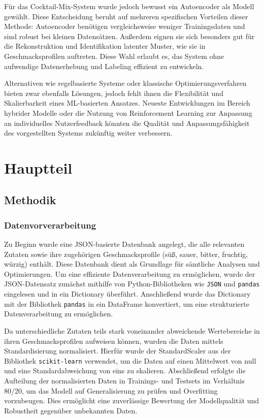 \documentclass[12pt, a4paper]{report}
\begin{document}
Für das Cocktail-Mix-System wurde jedoch bewusst ein Autoencoder als Modell gewählt. Diese Entscheidung beruht auf mehreren spezifischen Vorteilen dieser Methode: Autoencoder benötigen vergleichsweise weniger Trainingsdaten und sind robust bei kleinen Datensätzen. Außerdem eignen sie sich besonders gut für die Rekonstruktion und Identifikation latenter Muster, wie sie in Geschmacksprofilen auftreten. Diese Wahl erlaubt es, das System ohne aufwendige Datenerhebung und Labeling effizient zu entwickeln.

Alternativen wie regelbasierte Systeme oder klassische Optimierungsverfahren bieten zwar ebenfalls Lösungen, jedoch fehlt ihnen die Flexibilität und Skalierbarkeit eines ML-basierten Ansatzes. Neueste Entwicklungen im Bereich hybrider Modelle oder die Nutzung von Reinforcement Learning zur Anpassung an individuelles Nutzerfeedback könnten die Qualität und Anpassungsfähigkeit des vorgestellten Systems zukünftig weiter verbessern.


\chapter{Hauptteil}
\section{Methodik}

\subsection{Datenvorverarbeitung}
Zu Beginn wurde eine JSON-basierte Datenbank angelegt, die alle relevanten Zutaten sowie ihre zugehörigen Geschmacksprofile (süß, sauer, bitter, fruchtig, würzig) enthält. Diese Datenbank dient als Grundlage für sämtliche Analysen und Optimierungen. Um eine effiziente Datenverarbeitung zu ermöglichen, wurde der JSON-Datensatz zunächst mithilfe von Python-Bibliotheken wie \texttt{JSON} und \texttt{pandas} eingelesen und in ein Dictionary überführt. Anschließend wurde das Dictionary mit der Bibliothek \texttt{pandas} in ein DataFrame konvertiert, um eine strukturierte Datenverarbeitung zu ermöglichen.

Da unterschiedliche Zutaten teils stark voneinander abweichende Wertebereiche in ihren Geschmacksprofilen aufweisen können, wurden die Daten mittels Standardisierung normalisiert. Hierfür wurde der StandardScaler aus der Bibliothek \texttt{scikit-learn} verwendet, um die Daten auf einen Mittelwert von null und eine Standardabweichung von eins zu skalieren. Abschließend erfolgte die Aufteilung der normalisierten Daten in Trainings- und Testsets im Verhältnis 80/20, um das Modell auf Generalisierung zu prüfen und Overfitting vorzubeugen. Dies ermöglicht eine zuverlässige Bewertung der Modellqualität und Robustheit gegenüber unbekannten Daten.
\end{document}
